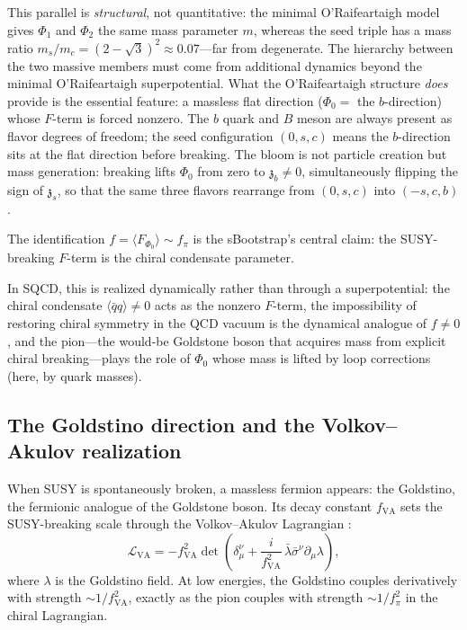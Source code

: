 \documentclass[12pt,a4paper]{article}
\newcommand{\qqbar}{\langle\bar{q}q\rangle}
\newcommand{\zch}{\mathfrak{z}}
\begin{document}
This parallel is \emph{structural}, not quantitative: the minimal 
O'Raifeartaigh model gives $\Phi_1$ and $\Phi_2$ the same mass 
parameter $m$, whereas the seed triple has a mass ratio 
$m_s/m_c = (2 - \sqrt{3})^2 \approx 0.07$---far from degenerate. 
The hierarchy between the two massive members must come from 
additional dynamics beyond the minimal O'Raifeartaigh superpotential. 
What the O'Raifeartaigh structure \emph{does} provide is the essential 
feature: a massless flat direction ($\Phi_0 = $ the $b$-direction) 
whose $F$-term is forced nonzero. The $b$ quark and $B$ meson are 
always present as flavor degrees of freedom; the seed configuration 
$(0, s, c)$ means the $b$-direction sits at the flat direction before 
breaking. The bloom is not particle creation but mass generation: 
breaking lifts $\Phi_0$ from zero to $\zch_b \neq 0$, simultaneously 
flipping the sign of $\zch_s$, so that the same three flavors 
rearrange from $(0, s, c)$ into $(-s, c, b)$.

The identification $f = \langle F_{\Phi_0}\rangle \sim f_\pi$ is the 
sBootstrap's central claim: the SUSY-breaking $F$-term is the chiral 
condensate parameter.

In SQCD, this is realized dynamically rather than through a 
superpotential: the chiral condensate $\qqbar \neq 0$ acts as the 
nonzero $F$-term, the impossibility of restoring chiral symmetry 
in the QCD vacuum is the dynamical analogue of $f \neq 0$, and the 
pion---the would-be Goldstone boson that acquires mass from explicit 
chiral breaking---plays the role of $\Phi_0$ whose mass is lifted 
by loop corrections (here, by quark masses).

\subsection{The Goldstino direction and the Volkov--Akulov realization}
\label{subsec:va}

When SUSY is spontaneously broken, a massless fermion appears: the 
Goldstino, the fermionic analogue of the Goldstone boson. Its decay 
constant $f_{\text{VA}}$ sets the SUSY-breaking scale through the 
Volkov--Akulov Lagrangian \cite{VolkovAkulov1973}:
\begin{equation}
\mathcal{L}_{\text{VA}} = -f_{\text{VA}}^2 \det\!\left(
\delta_\mu^\nu + \frac{i}{f_{\text{VA}}^2}\,\bar{\lambda}\bar{\sigma}^\nu
\partial_\mu\lambda\right),
\end{equation}
where $\lambda$ is the Goldstino field. At low energies, the Goldstino 
couples derivatively with strength $\sim 1/f_{\text{VA}}^2$, exactly 
as the pion couples with strength $\sim 1/f_\pi^2$ in the chiral 
Lagrangian.
\end{document}
